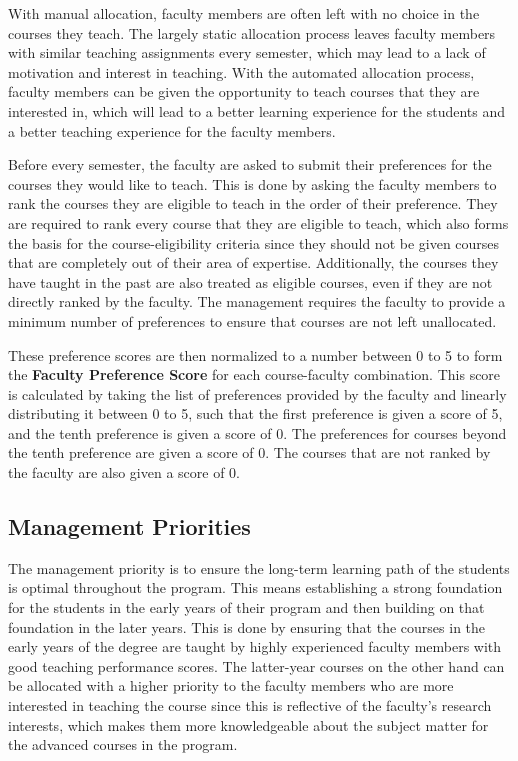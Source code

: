 With manual allocation, faculty members are often left with no choice in the courses they teach. The largely static allocation process leaves faculty members with similar teaching assignments every semester, which may lead to a lack of motivation and interest in teaching. With the automated allocation process, faculty members can be given the opportunity to teach courses that they are interested in, which will lead to a better learning experience for the students and a better teaching experience for the faculty members.

Before every semester, the faculty are asked to submit their preferences for the courses they would like to teach. This is done by asking the faculty members to rank the courses they are eligible to teach in the order of their preference. They are required to rank every course that they are eligible to teach, which also forms the basis for the course-eligibility criteria since they should not be given courses that are completely out of their area of expertise. Additionally, the courses they have taught in the past are also treated as eligible courses, even if they are not directly ranked by the faculty. The management requires the faculty to provide a minimum number of preferences to ensure that courses are not left unallocated.

These preference scores are then normalized to a number between 0 to 5 to form the \textbf{Faculty Preference Score} for each course-faculty combination. This score is calculated by taking the list of preferences provided by the faculty and linearly distributing it between 0 to 5, such that the first preference is given a score of 5, and the tenth preference is given a score of 0. The preferences for courses beyond the tenth preference are given a score of 0. The courses that are not ranked by the faculty are also given a score of 0.

\subsection{Management Priorities}

The management priority is to ensure the long-term learning path of the students is optimal throughout the program. This means establishing a strong foundation for the students in the early years of their program and then building on that foundation in the later years. This is done by ensuring that the courses in the early years of the degree are taught by highly experienced faculty members with good teaching performance scores. The latter-year courses on the other hand can be allocated with a higher priority to the faculty members who are more interested in teaching the course since this is reflective of the faculty's research interests, which makes them more knowledgeable about the subject matter for the advanced courses in the program.

